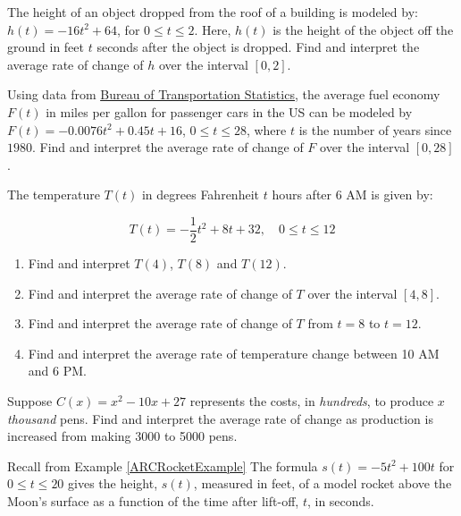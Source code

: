 \begin{exenum}

\item  The height of an object dropped from the roof of a building is modeled by:  $h(t) = -16t^2 + 64$, for $0 \leq t \leq 2$. Here,  $h(t)$ is the height of the object off the ground in feet $t$ seconds after the object is dropped.  Find and interpret the average rate of change of $h$ over the interval $[0,2]$.

\item Using data from \href{http://www.bts.gov/publications/national_transportation_statistics/html/table_04_23.html}{\underline{Bureau of Transportation Statistics}}, the average fuel economy $F(t)$ in miles per gallon for passenger cars in the US can be modeled by  $F(t) = -0.0076t^2+0.45t + 16$, $0 \leq t \leq 28$, where $t$ is the number of years since $1980$. Find and interpret the average rate of change of $F$ over the interval $[0,28]$.

\item  The temperature $T(t)$ in degrees Fahrenheit $t$ hours after 6 AM is given by:

\[ T(t) = -\frac{1}{2} t^2 + 8t+32, \quad 0 \leq t \leq 12\]

\begin{enumerate}

\item  Find and interpret $T(4)$, $T(8)$ and $T(12)$.

\item  Find and interpret the average rate of change of $T$ over the interval $[4,8]$.

\item  Find and interpret the average rate of change of $T$ from $t=8$ to $t=12$.

\item  Find and interpret the average rate of temperature change between 10 AM and 6 PM.

\end{enumerate}

\item  Suppose $C(x) = x^2-10x+27$ represents the costs, in \textit{hundreds}, to produce $x$ \textit{thousand} pens.  Find and interpret the average rate of change as production is increased from making 3000 to 5000 pens.

\item Recall from Example \ref{ARCRocketExample} The formula $s(t) = -5t^2+100t$ for $0 \leq t \leq 20$ gives the height, $s(t)$, measured in feet, of a model rocket above the Moon's surface as a function of the time after lift-off, $t$, in seconds.


\end{exenum}
